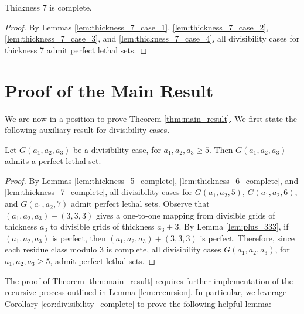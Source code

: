 \begin{lem}
Thickness 7 is complete.
\end{lem}

\begin{proof}
\label{lem:thickness_7_complete}
By Lemmas \ref{lem:thickness_7_case_1}, \ref{lem:thickness_7_case_2}, \ref{lem:thickness_7_case_3}, and \ref{lem:thickness_7_case_4}, all divisibility cases for thickness 7 admit perfect lethal sets.
\end{proof}

\section{Proof of the Main Result}

We are now in a position to prove Theorem \ref{thm:main_result}. We first state the following auxiliary result for divisibility cases. 

\begin{cor}
\label{cor:divisibility_complete}
Let $G(a_1,a_2,a_3)$ be a divisibility case, for $a_1, a_2, a_3 \geq 5$. Then $G(a_1,a_2,a_3)$ admits a perfect lethal set.
\end{cor}

\begin{proof}
By Lemmas \ref{lem:thickness_5_complete}, \ref{lem:thickness_6_complete}, and \ref{lem:thickness_7_complete}, all divisibility cases for $G(a_1,a_2,5)$, $G(a_1,a_2,6)$, and $G(a_1,a_2,7)$ admit perfect lethal sets. Observe that $(a_1,a_2,a_3) + (3,3,3)$ gives a one-to-one mapping from divisible grids of thickness $a_3$ to divisible grids of thickness $a_3+3$. By Lemma \ref{lem:plus_333}, if $(a_1,a_2,a_3)$ is perfect, then $(a_1,a_2,a_3) + (3,3,3)$ is perfect. Therefore, since each residue class modulo 3 is complete, all divisibility cases $G(a_1,a_2,a_3)$, for $a_1, a_2, a_3 \geq 5$, admit perfect lethal sets.
\end{proof}

The proof of Theorem \ref{thm:main_result} requires further implementation of the recursive process outlined in Lemma \ref{lem:recursion}. In particular, we leverage Corollary \ref{cor:divisibility_complete} to prove the following helpful lemma:


